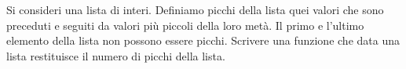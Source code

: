 \begin{Exercise}[label={ex:picchi}]
    Si consideri una lista di interi. 
    Definiamo picchi della lista quei valori che sono preceduti e seguiti da valori
    più piccoli della loro metà. Il primo e l'ultimo elemento della lista non possono essere picchi.
    Scrivere una funzione che data una lista restituisce il numero di picchi della lista.
\end{Exercise}

\begin{Answer}[ref={ex:picchi}]
  	
\end{Answer}